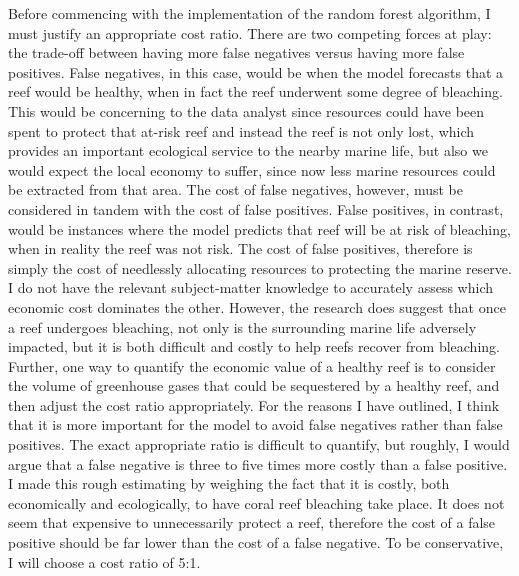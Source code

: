 \documentclass{article}
\begin{document}
Before commencing with the implementation of the random forest algorithm, I must justify an appropriate cost ratio. There are two competing forces at play: the trade-off between having more false negatives versus having more false positives. False negatives, in this case, would be when the model forecasts that a reef would be healthy, when in fact the reef underwent some degree of bleaching. This would be concerning to the data analyst since resources could have been spent to protect that at-risk reef and instead the reef is not only lost, which provides an important ecological service to the nearby marine life, but also we would expect the local economy to suffer, since now less marine resources could be extracted from that area. The cost of false negatives, however, must be considered in tandem with the cost of false positives. False positives, in contrast, would be instances where the model predicts that reef will be at risk of bleaching, when in reality the reef was not risk. The cost of false positives, therefore is simply the cost of needlessly allocating resources to protecting the marine reserve. I do not have the relevant subject-matter knowledge to accurately assess which economic cost dominates the other. However, the research does suggest that once a reef undergoes bleaching, not only is the surrounding marine life adversely impacted, but it is both difficult and costly to help reefs recover from bleaching. Further, one way to quantify the economic value of a healthy reef is to consider the volume of greenhouse gases that could be sequestered by a healthy reef, and then adjust the cost ratio appropriately. For the reasons I have outlined, I think that it is more important for the model to avoid false negatives rather than false positives. The exact appropriate ratio is difficult to quantify, but roughly, I would argue that a false negative is three to five times more costly than a false positive. I made this rough estimating by weighing the fact that it is costly, both economically and ecologically, to have coral reef bleaching take place. It does not seem that expensive to unnecessarily protect a reef, therefore the cost of a false positive should be far lower than the cost of a false negative. To be conservative, I will choose a cost ratio of 5:1.
\newpage
\end{document}
